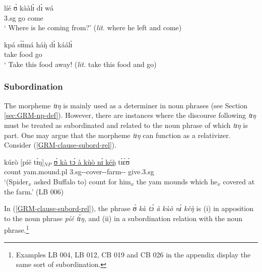 
\ea\label{GRM-clause-conn-di}

\ea\label{GRM-clause-conn-di-vp22.4.9.}
\gll líé ʊ̀ kààlɪ̀ dɪ̀ wá \\
     {\q} {\sc 3.sg} go {\conn} come  \\
\glt  ` Where is he coming from?' ({\it lit.} where he left and  come)

\ex\label{GRM-clause-conn-di-vp47.2.9.}
\gll kpá sɪ̀ɪ̀má háŋ̀ dɪ̀ káálɪ̀  \\
    take   food {\dem}  {\conn} go \\
\glt  ` Take this food away! ({\it lit.} take this food and go)


\z 
 \z



\subsubsection{Subordination}
\label{GRM-clause-subord}

The morpheme {\it tɪŋ} is mainly used as a  determiner in noun phrases  (see
Section \ref{sec:GRM-np-def}).  However, there are instances where the discourse
following {\it tɪŋ} must be treated as subordinated and related to the noun
phrase of which  {\it tɪŋ} is part. One may argue that the morpheme {\it tɪŋ} 
can
function  as a relativizer. Consider (\ref{GRM-clause-subord-rel}).

\ea\label{GRM-clause-subord-rel}
\gll  kúrò [píé tɪ́ŋ]$_{NP}$ \underline{ʊ̀ kà tɔ́ à kùò nɪ́ kéŋ̀}
tɪ̀ɛ̀ʊ́\\
   count   yam.mound.{\sc pl}  {\art}   {{\sc
3.sg}-{\egr}-cover-{\art}-farm-{\postp}-{\adv}}         give.{\sc 3.sg}\\
\glt  `(Spider$_{x}$ asked Buffalo to) count  for him$_{x}$ the yam mounds which
he$_{x}$ covered at the farm.' (LB 006)
 \z

In (\ref{GRM-clause-subord-rel}), the phrase {\it ʊ̀ kà tɔ́ à kùò nɪ́
kéŋ̀} is (i) in apposition to the noun phrase {\it píé tɪ́ŋ}, and (ii)
in a subordination relation with the noun phrase.\footnote{Examples 
LB 004, LB 012, CB 019 and  CB 026 in the appendix display the same sort of
subordination.}


